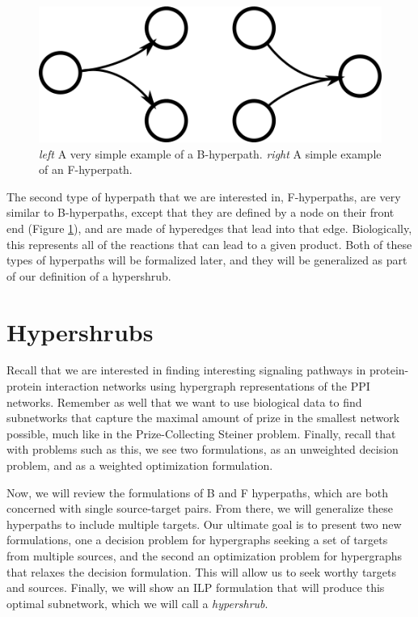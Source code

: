 \documentclass[12pt,twoside]{reedthesis}
\theoremstyle{definition}
\begin{document}
\begin{figure}[!h]
  \begin{center}
    \includegraphics[width=\textwidth/2]{BF-hyperpaths}
  \caption[Simple B-Hypergrah and F-Hypergraph.]{\textit{left }A very simple example of a B-hyperpath. \textit{right }A simple example of an F-hyperpath.}
  \label{fig:BF-hyperpaths}
  \end{center}
\end{figure}

The second type of hyperpath that we are interested in, F-hyperpaths, are very similar to B-hyperpaths, except that they are defined by a node on their front end (Figure \ref{fig:BF-hyperpaths}), and are made of hyperedges that lead into that edge. Biologically, this represents all of the reactions that can lead to a given product. Both of these types of hyperpaths will be formalized later, and they will be generalized as part of our definition of a hypershrub.

\chapter{Hypershrubs}

Recall that we are interested in finding interesting signaling pathways in protein-protein interaction networks using hypergraph representations of the PPI networks. Remember as well that we want to use biological data to find subnetworks that capture the maximal amount of prize in the smallest network possible, much like in the Prize-Collecting Steiner problem. Finally, recall that with problems such as this, we see two formulations, as an unweighted decision problem, and as a weighted optimization formulation.\par

Now, we will review the formulations of B and F hyperpaths, which are both concerned with single source-target pairs. From there, we will generalize these hyperpaths to include multiple targets. Our ultimate goal is to present two new formulations, one a decision problem for hypergraphs seeking a set of targets from multiple sources, and the second an optimization problem for hypergraphs that relaxes the decision formulation. This will allow us to seek worthy targets and sources. Finally, we will show an ILP formulation that will produce this optimal subnetwork, which we will call a \textit{hypershrub}.\par
\end{document}
